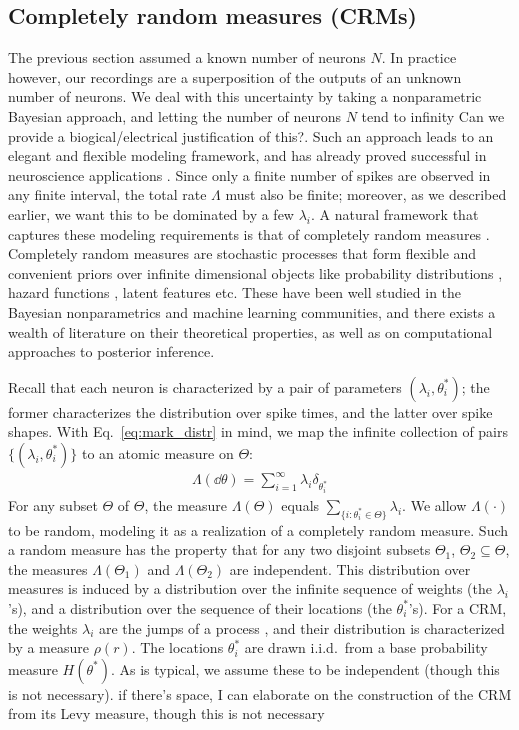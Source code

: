\subsection{Completely random measures (CRMs)}

The previous section assumed a known number of neurons $N$. In practice however, our recordings are a superposition of the outputs of an unknown
number of neurons. We deal with this uncertainty by taking a nonparametric Bayesian approach, and letting the number of neurons $N$ tend to infinity
{\color{red} Can we provide a biogical/electrical justification of this?}. 
Such an approach leads to an elegant and flexible modeling framework, and has  already proved successful in neuroscience applications
\citep{WoodBla2008}.
Since only a finite number of spikes are observed in any finite interval, the total rate $\Lambda$ must 
also be finite; moreover, as we described earlier, we want this to be dominated by a few $\lambda_i$. 
A natural framework that captures these  modeling requirements is that of completely random measures \citep{Kingman:PJM67}.
Completely random measures are stochastic processes that form flexible and convenient priors over
infinite dimensional objects like probability distributions \citep{JamesLP09}, hazard functions \citep{Hjo1990}, latent features \citep{ThiJor2007} etc. 
These have been well studied in the Bayesian nonparametrics and machine learning communities, and there exists a wealth of literature on
their theoretical properties, as well as on computational approaches to posterior inference.

Recall that each neuron is characterized by a pair of parameters $(\lambda_i, \theta^*_i)$; the former characterizes the distribution over spike times, 
and the latter over spike
shapes. With Eq.~\eqref{eq:mark_distr} in mind, we map the infinite collection of pairs $\{(\lambda_i, \theta^*_i)\}$ to an atomic measure on $\Theta$:
\begin{align}
  \Lambda(\dd \theta) = \sum_{i=1}^{\infty} \lambda_i \delta_{\theta^*_i}
\end{align}
For any subset $\varTheta$ of $\Theta$, the measure $\Lambda(\varTheta)$ equals \( \sum_{\{ i: \theta^*_i \in \varTheta \} } \lambda_i\). We allow $\Lambda(\cdot)$ to be random,
modeling it as a realization of a completely random measure. Such a random measure has the property that for any two disjoint subsets $\varTheta_1$,  $\varTheta_2 \subseteq \Theta$, the measures $\Lambda(\varTheta_1)$ and $\Lambda(\varTheta_2)$ are independent. 
This distribution over measures is induced by a distribution
over the infinite sequence of weights (the $\lambda_i$'s), and a distribution over the sequence of their locations (the $\theta^*_i$'s). 
For a CRM, the weights $\lambda_i$ are the jumps of a \Levy process \citep{Sato90}, and their distribution is characterized by a 
\Levy measure $\rho(r)$. The locations $\theta^*_i$ are drawn i.i.d.\  from a base probability measure $H(\theta^*)$.
As is typical, we assume these to be independent (though this is not necessary). {\color{red} if there's space, I
can elaborate on the construction of the CRM from its Levy measure, though this is not necessary}


